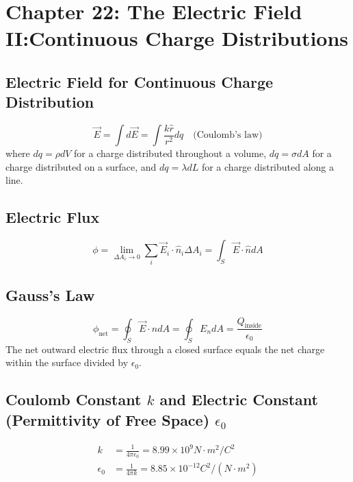 \documentclass[../main.tex]{subfiles}
\begin{document}
\section{Chapter 22: The Electric Field II:\@ Continuous Charge Distributions}\label{sec:chapter_22}

\subsection{Electric Field for Continuous Charge Distribution}\label{sub:electric_field_for_countinuous_charge_distriution}

\begin{equation}
  \vec{E} = \int{d\vec{E}} = \int{\frac{k\hat{r}}{r^2}dq} \quad \text{(Coulomb's law)}
\end{equation}
where \(dq=\rho dV\) for a charge distributed throughout a volume, \(dq =
\sigma dA\) for a charge distributed on a surface, and \(dq = \lambda dL\) for
a charge distributed along a line.

\subsection{Electric Flux}\label{sub:electric_flux}

\begin{equation}
  \phi = \lim_{\Delta A_i \to 0}\sum_{i}\vec{E}_i\cdot\hat{n}_i\Delta A_i =
  \int_S\vec{E}\cdot\hat{n}dA
\end{equation}

\subsection{Gauss's Law}\label{sub:gauss_s_law}

\begin{equation}
  \phi_{\text{net}} = \oint_{S}\vec{E}\cdot\hat{n}dA = \oint_{S}E_{n}dA =
  \frac{Q_{\text{inside}}}{\epsilon_{0}}
\end{equation}
The net outward electric flux through a closed surface equals the net charge
within the surface divided by \(\epsilon_0\).

\subsection{Coulomb Constant $k$ and Electric Constant (Permittivity of Free
Space) $\epsilon_0$}\label{sub:coulomb_constant_k_and_electric_constant_permittivity_of_free_space_epsilon_0_}

\begin{align}
  k &= \frac{1}{4\pi\epsilon_0} = 8.99\times 10^9N\cdot m^2/C^2\\
  \epsilon_0 &= \frac{1}{4\pi k} = 8.85\times 10^{-12}C^2/(N\cdot m^2)
\end{align}
\end{document}
